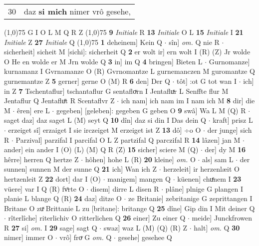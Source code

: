 \documentclass[8pt,a4paper,notitlepage]{article}
\begin{document}
\begin{table}[ht]
\begin{minipage}[t]{0.5\linewidth}
\begin{tabular}{rl}
30 & daz \textbf{si mich} nimer vrô gesehe,\\ 
\end{tabular}
\scriptsize
\line(1,0){75} \newline
G I O L M Q R Z \newline
\line(1,0){75} \newline
\textbf{9} \textit{Initiale} R  \textbf{13} \textit{Initiale} O L  \textbf{15} \textit{Initiale} I  \textbf{21} \textit{Initiale} Z  \textbf{27} \textit{Initiale} Q  \newline
\line(1,0){75} \newline
\textbf{1} deheinem] Kein Q  $\cdot$ sîn] \textit{om.} Q nie R  $\cdot$ sicherheit] sicheit M [sichi]: sicherheit Q \textbf{2} er wolt ir] ern wolt I (R) (Z) Jr wolde O He en wolde er M Jrn wolde Q \textbf{3} in] im Q \textbf{4} bringen] Bieten L  $\cdot$ Gurnomanze] kurnamanz I Gvrnamanze O (R) Gvrnomantze L gurnemanczen M guromantze Q gurnemantze Z \textbf{5} gerner] gerne O (M) R \textbf{6} den] Der Q  $\cdot$ tôt] :ot G tot wan I  $\cdot$ ich] in Z \textbf{7} Tschentaflur] tschantaflur G sentafloͮrn I Jentafluͯr L Senffte flur M Jentaflur Q Jentafluͦt R Scentaflvr Z  $\cdot$ ich nam] ich nam im I nam ich M \textbf{8} dir] die M  $\cdot$ êren] ere L  $\cdot$ gegeben] [geleben]: gegeben G geben O \textbf{9} swâ] Wa L M (Q) R  $\cdot$ saget daz] daz saget L (M) seyt Q \textbf{10} dîn] daz si din I Das dein Q  $\cdot$ kraft] prisz L  $\cdot$ erzeiget sî] erzaiget I sie irczeiget M erzeiget ist Z \textbf{13} dô] ÷o O  $\cdot$ der junge] sich R  $\cdot$ Parzival] parzifal I parcifal O L Z partzifal Q parczifal R \textbf{14} lâzen] jan M  $\cdot$ ander] ein ander I (O) (L) (M) Q R (Z) \textbf{15} sicher] sciere M (Q)  $\cdot$ der] dy M \textbf{16} hêrre] herren Q hertze Z  $\cdot$ hôhen] hohe L (R) \textbf{20} kleine] \textit{om.} O  $\cdot$ als] sam L  $\cdot$ der sunnen] sunnen M der sunne Q \textbf{21} ich] Wan ich Z  $\cdot$ herzeleit] ir herzenlæit O hertzenleit Z \textbf{22} dort] dar I (O)  $\cdot$ manigem] mangen Q  $\cdot$ küenen] chuͤnem I \textbf{23} vüere] var I Q (R) fvͦrte O  $\cdot$ disem] dirre L disen R  $\cdot$ plâne] plnige G plangen I planie L blange Q (R) \textbf{24} daz] ditze O  $\cdot$ ze Britanie] zebritanige G zeprittangen I Britane O zuͯ Brittanie L zu [britane]: britange Q \textbf{25} dîne] Gip din I Mit deiner Q  $\cdot$ rîterlîche] riterlichiv O ritterlichen Q \textbf{26} einer] Zu einer Q  $\cdot$ meide] Junckfrowen R \textbf{27} si] \textit{om.} I \textbf{29} sage] sagt Q  $\cdot$ swaz] waz L (M) (Q) (R) Z  $\cdot$ halt] \textit{om.} Q \textbf{30} nimer] immer O  $\cdot$ vrô] froͮ G \textit{om.} Q  $\cdot$ gesehe] gesehee Q \newline

\end{minipage}
\end{table}
\end{document}
